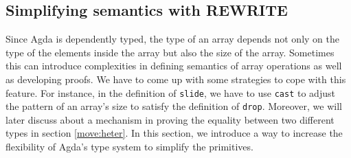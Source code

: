 \documentclass{l4proj}
\begin{document}
\subsection{Simplifying semantics with REWRITE}
\label{prim:rewrite}
Since Agda is dependently typed, the type of an array depends not only on the type of the elements inside the array but also the size of the array. Sometimes this can introduce complexities in defining semantics of array operations as well as developing proofs. We have to come up with some strategies to cope with this feature. For instance, in the definition of \texttt{slide}, we have to use \texttt{cast} to adjust the pattern of an array's size to satisfy the definition of \texttt{drop}. Moreover, we will later discuss about a mechanism in proving the equality between two different types in section \ref{move:heter}. In this section, we introduce a way to increase the flexibility of Agda's type system to simplify the primitives.
\end{document}
